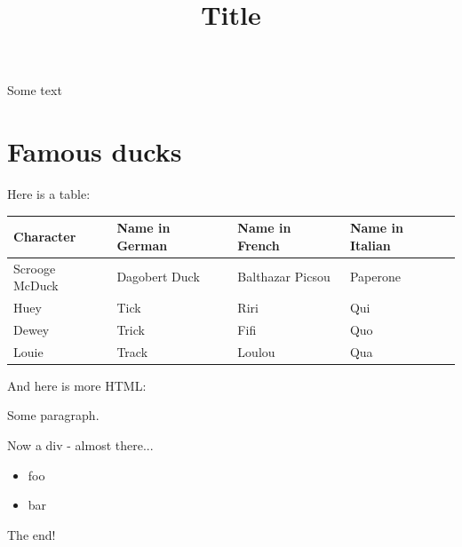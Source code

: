\documentclass[11pt,a4paper]{article}
\title{Title}
\begin{document}
\maketitle

Some text

\section{Famous ducks}

Here is a table:

\begin{table}[h]
\begin{tabular}{|l|l|l|l|}
\hline
Character & Name in German & Name in French & Name in Italian \\ \hline
Scrooge McDuck & Dagobert Duck & Balthazar Picsou & Paperone \\ \hline
Huey & Tick & Riri & Qui \\ \hline
Dewey & Trick & Fifi & Quo \\ \hline
Louie & Track & Loulou & Qua \\ \hline
\end{tabular}
\end{table}

And here is more HTML:

Some paragraph.

Now a div - almost there...

\begin{itemize}
\item foo
\item bar
\end{itemize}

The end!
\end{document}
